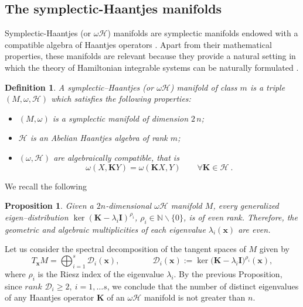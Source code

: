 \documentclass[10pt]{amsart}
\numberwithin{equation}{section}
\newtheorem{definition}{Definition}
\newtheorem{proposition}{Proposition}
\theoremstyle{definition}
\begin{document}
	\vspace{2mm}
	
	
	
	
	
	\subsection{The symplectic-Haantjes manifolds}
	
	
	Symplectic-Haantjes (or $\omega \mathscr{H}$) manifolds are symplectic manifolds endowed with a compatible algebra of Haantjes operators \cite{TT2021JGP,TT2022AMPA,TT2022CMP}. Apart from their mathematical properties, these manifolds are relevant because they provide a natural setting in which the theory of Hamiltonian integrable systems can be naturally formulated \cite{KRTT2024PRA,RTT2022CNS,RTT2024AMPA}.
	
	
	
	\begin{definition}\label{def:oHman}
		A symplectic--Haantjes (or $\omega \mathscr{H}$) manifold of class $m$ is a triple $( M,\omega,\mathscr{H})$ which satisfies the following properties:
		\begin{itemize}
			\item[(i)]
			$(M,\omega)$ is a symplectic manifold of dimension $ 2 \, n$;
			\item[(ii)]
			$\mathscr{H}$ is an Abelian Haantjes algebra of rank $m$;
			\item[(iii)]
			$(\omega,\mathscr{H})$ are algebraically compatible, that is
			\begin{equation}
				\omega(X,\boldsymbol{K} Y)=\omega(\boldsymbol{K} X,Y) \qquad \forall \boldsymbol{K} \in \mathscr{H}\ .
			\end{equation}
		\end{itemize}
	\end{definition}
	
We recall the following
	\begin{proposition}\label{lm:aupari} \cite{TT2022AMPA}
		Given a $2n$-dimensional $\omega \mathscr{H}$ manifold $M$, every generalized eigen--distribution $\ker(\boldsymbol{K}-\lambda_{i } \boldsymbol{I})^{{\rho_i}}$, $\rho_i \in \mathbb{N}\backslash\{0\}$, is of even rank.
		Therefore, the geometric and algebraic multiplicities of each eigenvalue $\lambda_{i }(\boldsymbol{x})$ are even.
	\end{proposition}
	
	
	
	Let us consider the spectral decomposition of the tangent spaces of $M$ given by
	\begin{equation}\label{def:Di}
		T_{\boldsymbol{x}}M=\bigoplus_{i=1}^s \mathcal{D}_i(\boldsymbol{x}), \qquad \qquad
		\mathcal{D}_i(\boldsymbol{x}) :=
		\ker\big(\boldsymbol{K}-\lambda_i\boldsymbol{I}\big)^{\rho_i}(\boldsymbol{x}),
	\end{equation}
	where $\rho_i$ is the Riesz index of the eigenvalue $\lambda_i$. By the previous Proposition, since $rank$ $\mathcal{D}_i\geq 2, \ i=1,\ldots s$, we conclude that the number of distinct eigenvalues of any
	Haantjes operator $\boldsymbol{K}$ of an $\omega\mathscr{H}$ manifold is not greater than $n$.
	
\end{document}
